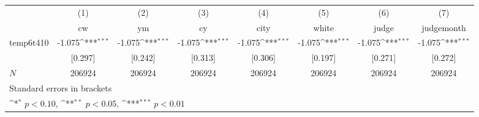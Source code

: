 {
\def\sym#1{\ifmmode^{#1}\else\(^{#1}\)\fi}
\begin{tabular}{l*{7}{c}}
\hline\hline
            &\multicolumn{1}{c}{(1)}&\multicolumn{1}{c}{(2)}&\multicolumn{1}{c}{(3)}&\multicolumn{1}{c}{(4)}&\multicolumn{1}{c}{(5)}&\multicolumn{1}{c}{(6)}&\multicolumn{1}{c}{(7)}\\
            &\multicolumn{1}{c}{cw}&\multicolumn{1}{c}{ym}&\multicolumn{1}{c}{cy}&\multicolumn{1}{c}{city}&\multicolumn{1}{c}{white}&\multicolumn{1}{c}{judge}&\multicolumn{1}{c}{judgemonth}\\
\hline
temp6t410   &      -1.075\sym{***}&      -1.075\sym{***}&      -1.075\sym{***}&      -1.075\sym{***}&      -1.075\sym{***}&      -1.075\sym{***}&      -1.075\sym{***}\\
            &     [0.297]         &     [0.242]         &     [0.313]         &     [0.306]         &     [0.197]         &     [0.271]         &     [0.272]         \\
\hline
\(N\)       &      206924         &      206924         &      206924         &      206924         &      206924         &      206924         &      206924         \\
\hline\hline
\multicolumn{8}{l}{\footnotesize Standard errors in brackets}\\
\multicolumn{8}{l}{\footnotesize \sym{*} \(p<0.10\), \sym{**} \(p<0.05\), \sym{***} \(p<0.01\)}\\
\end{tabular}
}
